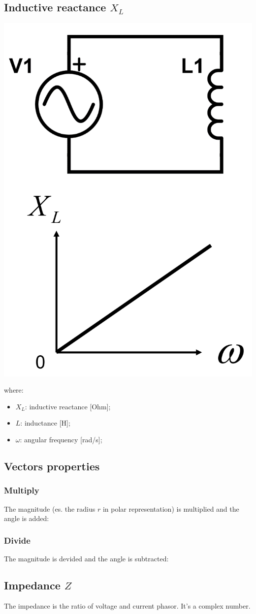 \documentclass{article}
\begin{document}

\subsection{Inductive reactance $X_L$}
\begin{center}
    \includegraphics[width=.3\textwidth]{media/linear_capacitive_reactance.png}
\end{center}


where:
\begin{itemize}
    \item $X_L$: inductive reactance [Ohm];
    \item $L$: inductance [H];
    \item $\omega$: angular frequency [rad/s];
\end{itemize}

\newpage
\subsection{Vectors properties}
\subsubsection{Multiply}
The magnitude (es. the radius $r$ in polar representation) is
multiplied and the angle is added:

\subsubsection{Divide}
The magnitude is devided and the angle is subtracted:

\subsection{Impedance $Z$}
The impedance is the ratio of voltage and current phasor. It's a complex number.
\end{document}
